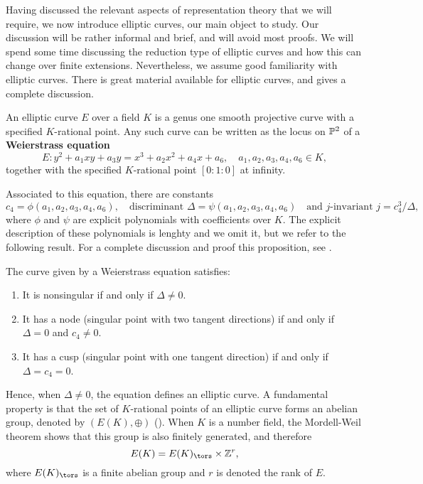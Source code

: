 
Having discussed the relevant aspects of representation theory that we will require, we now introduce elliptic curves, our main object to study. Our discussion will be rather informal and brief, and will avoid most proofs. We will spend some time discussing the reduction type of elliptic curves and how this can change over finite extensions. Nevertheless, we assume good familiarity with elliptic curves. There is great material available for elliptic curves, and \cite{S1} gives a complete discussion.

An elliptic curve $E$ over a field $K$ is a genus one smooth projective curve with a specified $K$-rational point. Any such curve can be written as the locus on $\mathbb{P}^2$ of a \textbf{Weierstrass equation}
\begin{equation}\label{eqn_gen_elliptic}
    E: y^2+a_1xy+a_3y=x^3+a_2x^2+a_4x+a_6,\quad a_1,a_2,a_3,a_4,a_6\in K,
\end{equation}
together with the specified $K$-rational point $[0:1:0]$ at infinity.

Associated to this equation, there are constants
$$c_4=\phi(a_1,a_2,a_3,a_4,a_6),\quad\text{discriminant } \Delta=\psi(a_1,a_2,a_3,a_4,a_6)\quad \text{and $j$-invariant }j=c_4^3/\Delta,$$
where $\phi$ and $\psi$ are explicit polynomials with coefficients over $K$. 
The explicit description of these polynomials is lenghty and we omit it, but we refer to the following result. For a complete discussion and proof this proposition, see \cite[\S III.1]{S1}.

\begin{prop}\label{prop_nodecusp}
    The curve given by a Weierstrass equation satisfies:
    \begin{enumerate}
        \item It is nonsingular if and only if $\Delta\neq0$.
        \item It has a node (singular point with two tangent directions) if and only if $\Delta=0$ and $c_4 \neq 0$.
        \item It has a cusp (singular point with one tangent direction) if and only if $\Delta= c_4 = 0$. 
    \end{enumerate}
\end{prop}

Hence, when $\Delta\neq0$, the equation defines an elliptic curve. A fundamental property is that the set of $K$-rational points of an elliptic curve forms an abelian group, denoted by $(E(K),\oplus)$ (\cite[\S III.2]{S1}). When $K$ is a number field, the Mordell-Weil theorem shows that this group is also finitely generated, and therefore 
$$E(K)=E(K)_{\tors}\times\ZZ^r,$$
where $E(K)_{\tors}$ is a finite abelian group and $r$ is denoted the rank of $E$.
